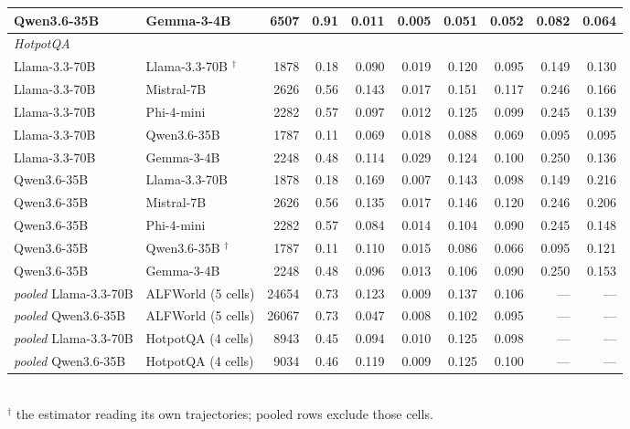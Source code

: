 \begin{table}[t]
\begin{tabular}{llrrrrrrrr}
Qwen3.6-35B & Gemma-3-4B & 6507 & 0.91 & 0.011 & 0.005 & 0.051 & 0.052 & 0.082 & 0.064 \\
\midrule
\multicolumn{10}{l}{\emph{HotpotQA}} \\
Llama-3.3-70B & Llama-3.3-70B $^{\dagger}$ & 1878 & 0.18 & 0.090 & 0.019 & 0.120 & 0.095 & 0.149 & 0.130 \\
Llama-3.3-70B & Mistral-7B & 2626 & 0.56 & 0.143 & 0.017 & 0.151 & 0.117 & 0.246 & 0.166 \\
Llama-3.3-70B & Phi-4-mini & 2282 & 0.57 & 0.097 & 0.012 & 0.125 & 0.099 & 0.245 & 0.139 \\
Llama-3.3-70B & Qwen3.6-35B & 1787 & 0.11 & 0.069 & 0.018 & 0.088 & 0.069 & 0.095 & 0.095 \\
Llama-3.3-70B & Gemma-3-4B & 2248 & 0.48 & 0.114 & 0.029 & 0.124 & 0.100 & 0.250 & 0.136 \\
Qwen3.6-35B & Llama-3.3-70B & 1878 & 0.18 & 0.169 & 0.007 & 0.143 & 0.098 & 0.149 & 0.216 \\
Qwen3.6-35B & Mistral-7B & 2626 & 0.56 & 0.135 & 0.017 & 0.146 & 0.120 & 0.246 & 0.206 \\
Qwen3.6-35B & Phi-4-mini & 2282 & 0.57 & 0.084 & 0.014 & 0.104 & 0.090 & 0.245 & 0.148 \\
Qwen3.6-35B & Qwen3.6-35B $^{\dagger}$ & 1787 & 0.11 & 0.110 & 0.015 & 0.086 & 0.066 & 0.095 & 0.121 \\
Qwen3.6-35B & Gemma-3-4B & 2248 & 0.48 & 0.096 & 0.013 & 0.106 & 0.090 & 0.250 & 0.153 \\
\midrule
\emph{pooled} Llama-3.3-70B & ALFWorld (5 cells) & 24654 & 0.73 & 0.123 & 0.009 & 0.137 & 0.106 & --- & --- \\
\emph{pooled} Qwen3.6-35B & ALFWorld (5 cells) & 26067 & 0.73 & 0.047 & 0.008 & 0.102 & 0.095 & --- & --- \\
\emph{pooled} Llama-3.3-70B & HotpotQA (4 cells) & 8943 & 0.45 & 0.094 & 0.010 & 0.125 & 0.098 & --- & --- \\
\emph{pooled} Qwen3.6-35B & HotpotQA (4 cells) & 9034 & 0.46 & 0.119 & 0.009 & 0.125 & 0.100 & --- & --- \\
\bottomrule
\end{tabular}
\\[2pt]\footnotesize $^{\dagger}$ the estimator reading its own trajectories; pooled rows exclude those cells.
\end{table}
